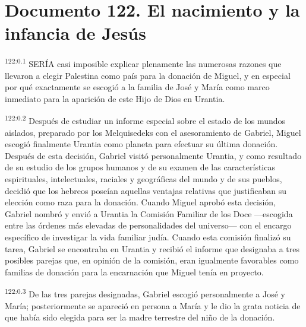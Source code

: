 \chapter{Documento 122. El nacimiento y la infancia de Jesús}
\par 
\textsuperscript{122:0.1} SERÍA casi imposible explicar plenamente las numerosas razones que llevaron a elegir Palestina como país para la donación de Miguel, y en especial por qué exactamente se escogió a la familia de José y María como marco inmediato para la aparición de este Hijo de Dios en Urantia.

\par 
\textsuperscript{122:0.2} Después de estudiar un informe especial sobre el estado de los mundos aislados, preparado por los Melquisedeks con el asesoramiento de Gabriel, Miguel escogió finalmente Urantia como planeta para efectuar su última donación. Después de esta decisión, Gabriel visitó personalmente Urantia, y como resultado de su estudio de los grupos humanos y de su examen de las características espirituales, intelectuales, raciales y geográficas del mundo y de sus pueblos, decidió que los hebreos poseían aquellas ventajas relativas que justificaban su elección como raza para la donación. Cuando Miguel aprobó esta decisión, Gabriel nombró y envió a Urantia la Comisión Familiar de los Doce ---escogida entre las órdenes más elevadas de personalidades del universo--- con el encargo específico de investigar la vida familiar judía. Cuando esta comisión finalizó su tarea, Gabriel se encontraba en Urantia y recibió el informe que designaba a tres posibles parejas que, en opinión de la comisión, eran igualmente favorables como familias de donación para la encarnación que Miguel tenía en proyecto.

\par 
\textsuperscript{122:0.3} De las tres parejas designadas, Gabriel escogió personalmente a José y María; posteriormente se apareció en persona a María y le dio la grata noticia de que había sido elegida para ser la madre terrestre del niño de la donación.

